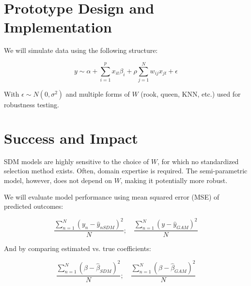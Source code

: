 \documentclass{article}
\begin{document}
\section{Prototype Design and Implementation}

We will simulate data using the following structure:

\begin{equation}
	y \sim \alpha + \sum^p_{i=1} x_{it} \beta_i + \rho \sum^N_{j=1} w_{ij} x_{jt} + \epsilon
\end{equation}

With $\epsilon \sim N(0,\sigma^2)$ and multiple forms of $W$ (rook, queen, KNN, etc.) used for robustness testing.

\section{Success and Impact}

SDM models are highly sensitive to the choice of $W$, for which no standardized selection method exists. Often, domain expertise is required. The semi-parametric model, however, does not depend on $W$, making it potentially more robust.

We will evaluate model performance using mean squared error (MSE) of predicted outcomes:

\begin{equation}
	\frac{\sum_{n=1}^N(y_n-\hat{y}_{nSDM})^2}{N}; \quad \frac{\sum_{n=1}^N(y-\hat{y}_{GAM})^2}{N}
	\label{eq:pref}
\end{equation}

And by comparing estimated vs. true coefficients:

\begin{equation}
	\frac{\sum_{n=1}^N(\beta-\hat{\beta}_{SDM})^2}{N}; \quad \frac{\sum_{n=1}^N(\beta-\hat{\beta}_{GAM})^2}{N}
	\label{eq:pref2}
\end{equation}

\newpage



\end{document}
